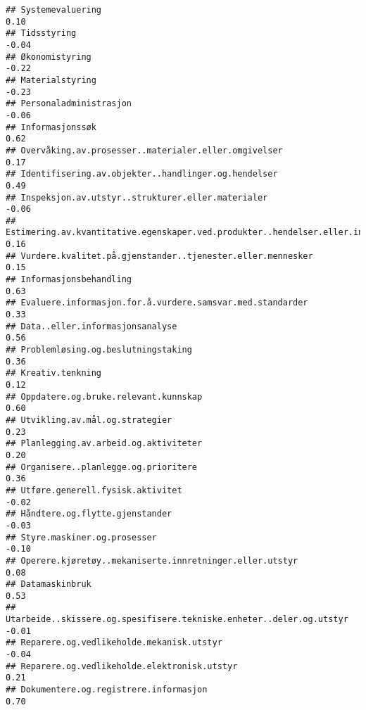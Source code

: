 \documentclass[
]{article}
\begin{document}
\begin{verbatim}
## Systemevaluering                                                                  0.10
## Tidsstyring                                                                      -0.04
## Økonomistyring                                                                   -0.22
## Materialstyring                                                                  -0.23
## Personaladministrasjon                                                           -0.06
## Informasjonssøk                                                                   0.62
## Overvåking.av.prosesser..materialer.eller.omgivelser                              0.17
## Identifisering.av.objekter..handlinger.og.hendelser                               0.49
## Inspeksjon.av.utstyr..strukturer.eller.materialer                                -0.06
## Estimering.av.kvantitative.egenskaper.ved.produkter..hendelser.eller.informasjon  0.16
## Vurdere.kvalitet.på.gjenstander..tjenester.eller.mennesker                        0.15
## Informasjonsbehandling                                                            0.63
## Evaluere.informasjon.for.å.vurdere.samsvar.med.standarder                         0.33
## Data..eller.informasjonsanalyse                                                   0.56
## Problemløsing.og.beslutningstaking                                                0.36
## Kreativ.tenkning                                                                  0.12
## Oppdatere.og.bruke.relevant.kunnskap                                              0.60
## Utvikling.av.mål.og.strategier                                                    0.23
## Planlegging.av.arbeid.og.aktiviteter                                              0.20
## Organisere..planlegge.og.prioritere                                               0.36
## Utføre.generell.fysisk.aktivitet                                                 -0.02
## Håndtere.og.flytte.gjenstander                                                   -0.03
## Styre.maskiner.og.prosesser                                                      -0.10
## Operere.kjøretøy..mekaniserte.innretninger.eller.utstyr                           0.08
## Datamaskinbruk                                                                    0.53
## Utarbeide..skissere.og.spesifisere.tekniske.enheter..deler.og.utstyr             -0.01
## Reparere.og.vedlikeholde.mekanisk.utstyr                                         -0.04
## Reparere.og.vedlikeholde.elektronisk.utstyr                                       0.21
## Dokumentere.og.registrere.informasjon                                             0.70

\end{verbatim}
\end{document}
